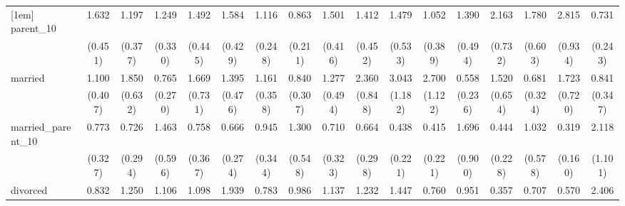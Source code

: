 {\begin{tabular}{l*{16}{c}}
[1em]
parent\_10           &       1.632         &       1.197         &       1.249         &       1.492         &       1.584         &       1.116         &       0.863         &       1.501         &       1.412         &       1.479         &       1.052         &       1.390         &       2.163\sym{*}  &       1.780         &       2.815\sym{**} &       0.731         \\
                    &     (0.451)         &     (0.377)         &     (0.330)         &     (0.445)         &     (0.429)         &     (0.248)         &     (0.211)         &     (0.416)         &     (0.452)         &     (0.533)         &     (0.389)         &     (0.494)         &     (0.732)         &     (0.603)         &     (0.934)         &     (0.243)         \\
[1em]
married             &       1.100         &       1.850         &       0.765         &       1.669         &       1.395         &       1.161         &       0.840         &       1.277         &       2.360\sym{*}  &       3.043\sym{**} &       2.700\sym{*}  &       0.558         &       1.520         &       0.681         &       1.723         &       0.841         \\
                    &     (0.407)         &     (0.632)         &     (0.270)         &     (0.731)         &     (0.476)         &     (0.358)         &     (0.307)         &     (0.494)         &     (0.848)         &     (1.182)         &     (1.122)         &     (0.236)         &     (0.654)         &     (0.324)         &     (0.720)         &     (0.347)         \\
[1em]
married\_parent\_10   &       0.773         &       0.726         &       1.463         &       0.758         &       0.666         &       0.945         &       1.300         &       0.710         &       0.664         &       0.438         &       0.415         &       1.696         &       0.444         &       1.032         &       0.319\sym{*}  &       2.118         \\
                    &     (0.327)         &     (0.294)         &     (0.596)         &     (0.367)         &     (0.274)         &     (0.344)         &     (0.548)         &     (0.323)         &     (0.298)         &     (0.221)         &     (0.221)         &     (0.900)         &     (0.228)         &     (0.578)         &     (0.160)         &     (1.101)         \\
[1em]
divorced            &       0.832         &       1.250         &       1.106         &       1.098         &       1.939\sym{*}  &       0.783         &       0.986         &       1.137         &       1.232         &       1.447         &       0.760         &       0.951         &       0.357\sym{*}  &       0.707         &       0.570         &       2.406\sym{*}  \\

\end{tabular}}
